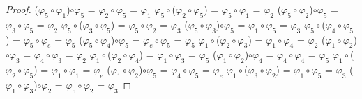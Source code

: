 \documentclass[10pt,a4paper,oneside]{article}
\begin{document}
\begin{proof}
				($\varphi_{5}\circ\varphi_{1}$)$\circ\varphi_{5}$ = $\varphi_{2}\circ\varphi_{5}$ = $\varphi_{1}$
				\newline
				\newline
				$\varphi_{5}\circ$($\varphi_{2}\circ\varphi_{5}$) = $\varphi_{5}\circ\varphi_{1}$ = $\varphi_{2}$
				\newline
				($\varphi_{5}\circ\varphi_{2}$)$\circ\varphi_{5}$ = $\varphi_{3}\circ\varphi_{5}$ = $\varphi_{2}$
				\newline
				\newline
				$\varphi_{5}\circ$($\varphi_{3}\circ\varphi_{5}$) = $\varphi_{5}\circ\varphi_{2}$ = $\varphi_{3}$
				\newline
				($\varphi_{5}\circ\varphi_{3}$)$\circ\varphi_{5}$ = $\varphi_{1}\circ\varphi_{5}$ = $\varphi_{3}$
				\newline
				\newline
				$\varphi_{5}\circ$($\varphi_{4}\circ\varphi_{5}$) = $\varphi_{5}\circ\varphi_{e}$ = $\varphi_{5}$
				\newline
				($\varphi_{5}\circ\varphi_{4}$)$\circ\varphi_{5}$ = $\varphi_{e}\circ\varphi_{5}$ = $\varphi_{5}$
				\newline
				\newline
				$\varphi_{1}\circ$($\varphi_{2}\circ\varphi_{3}$) = $\varphi_{1}\circ\varphi_{4}$ = $\varphi_{2}$
				\newline
				($\varphi_{1}\circ\varphi_{2}$)$\circ\varphi_{3}$ = $\varphi_{4}\circ\varphi_{3}$ = $\varphi_{2}$
				\newline
				\newline
				$\varphi_{1}\circ$($\varphi_{2}\circ\varphi_{4}$) = $\varphi_{1}\circ\varphi_{3}$ = $\varphi_{5}$
				\newline
				($\varphi_{1}\circ\varphi_{2}$)$\circ\varphi_{4}$ = $\varphi_{4}\circ\varphi_{4}$ = $\varphi_{5}$
				\newline
				\newline
				$\varphi_{1}\circ$($\varphi_{2}\circ\varphi_{5}$) = $\varphi_{1}\circ\varphi_{1}$ = $\varphi_{e}$
				\newline
				($\varphi_{1}\circ\varphi_{2}$)$\circ\varphi_{5}$ = $\varphi_{4}\circ\varphi_{5}$ = $\varphi_{e}$
				\newline
				\newline
				$\varphi_{1}\circ$($\varphi_{3}\circ\varphi_{2}$) = $\varphi_{1}\circ\varphi_{5}$ = $\varphi_{3}$
				\newline
				($\varphi_{1}\circ\varphi_{3}$)$\circ\varphi_{2}$ = $\varphi_{5}\circ\varphi_{2}$ = $\varphi_{3}$

\end{proof}
\end{document}
